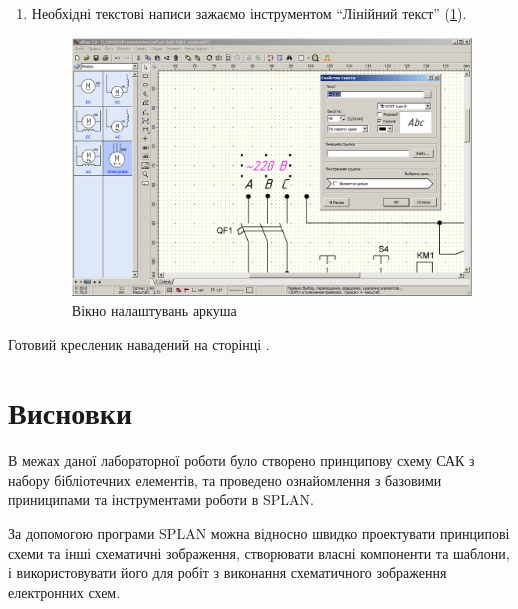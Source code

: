 \begin{enumerate}[leftmargin=*]
\item Необхідні текстові написи зажаємо інструментом ``Лінійний текст'' (\ref{fig:lab1:step4}).
  \begin{figure}[!ht]
    \centering \includegraphics[width=0.7\linewidth]{./images/lab1/step4.png}
    \caption{Вікно налаштувань аркуша}
    \label{fig:lab1:step4} 
  \end{figure}
  \FloatBarrier
\end{enumerate}

Готовий кресленик навадений на сторінці \pageref{lab1:pdf:drawing}.
\newpage
\NoBorder
\label{lab1:pdf:drawing}
 \BorderText
\newpage

\BorderText

\section*{Висновки}

В межах даної лабораторної роботи було створено принципову схему САК з набору бібліотечних
елементів, та проведено ознайомлення з базовими приниципами та інструментами роботи в SPLAN.

За допомогою програми SPLAN можна відносно швидко проектувати принципові схеми та інші схематичні
зображення, створювати власні компоненти та шаблони, і використовувати його для робіт з виконання
схематичного зображення електронних схем.
